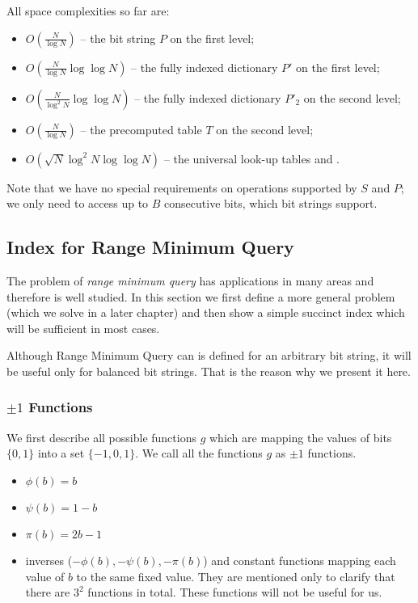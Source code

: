 \bigskip

All space complexities so far are:
\begin{itemize}
	\item $O(\frac{N}{\log N})$ -- the bit string $P$ on the first level;
	\item $O(\frac{N}{\log N}\log \log N)$ -- the fully indexed dictionary $P'$ on the first level;
	\item $O(\frac{N}{\log^2 N}\log \log N)$ -- the fully indexed dictionary $P'_2$ on the second level;
	\item $O(\frac{N}{\log N})$ -- the precomputed table $T$ on the second level;
	\item $O(\sqrt{N}\log^2 N \log\log N)$ -- the universal look-up tables \fwdSearch{} and \bwdSearch{}.
\end{itemize}
Note that we have no special requirements on operations supported by $S$ and $P$; we only need to access up to $B$ consecutive bits, which bit strings support.

\subsection{Index for Range Minimum Query}

The problem of \emph{range minimum query} has applications in many areas and therefore is well studied. 
In this section we first define a more general problem (which we solve in a later chapter) and then show a simple succinct index which will be sufficient in most cases.

Although Range Minimum Query can is defined for an arbitrary bit string, it will be useful only for balanced bit strings.
That is the reason why we present it here.

\subsubsection{$\pm 1$ Functions}\label{ss:rmq-def}

We first describe all possible functions $g$ which are mapping the values of bits $\{0, 1\}$ into a set $\{-1, 0, 1\}$.
We call all the functions $g$ as $\pm 1$ functions.
\begin{itemize}
	\item $\phi(b) = b$
	\item $\psi(b) = 1 - b$
	\item $\pi(b) = 2 b - 1$
	\item inverses ($-\phi(b), -\psi(b), -\pi(b)$) and constant functions mapping each value of $b$ to the same fixed value.
	They are mentioned only to clarify that there are $3^2$ functions in total.
	These functions will not be useful for us.
\end{itemize}

